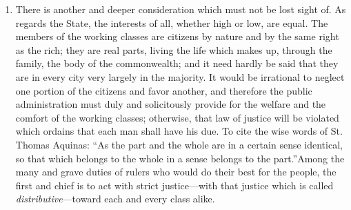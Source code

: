 \documentclass{book}
\begin{document}
\begin{enumerate}
	\item There is another and deeper consideration which must not be lost sight of. As regards the State, the interests of all, whether high or low, are equal. The members of the working classes are citizens by nature and by the same right as the rich; they are real parts, living the life which makes up, through the family, the body of the commonwealth; and it need hardly be said that they are in every city very largely in the majority. It would be irrational to neglect one portion of the citizens and favor another, and therefore the public administration must duly and solicitously provide for the welfare and the comfort of the working classes; otherwise, that law of justice will be violated which ordains that each man shall have his due. To cite the wise words of St. Thomas Aquinas: “As the part and the whole are in a certain sense identical, so that which belongs to the whole in a sense belongs to the part.”\footnotemark[26] Among the many and grave duties of rulers who would do their best for the people, the first and chief is to act with strict justice—with that justice which is called \emph{distributive}—toward each and every class alike.



\end{enumerate}
\end{document}
